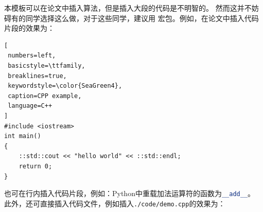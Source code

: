 \label{sec:algorithm}
\begin{algorithm}[ht]
    \caption{梯度下降算法}
    \label{algo:sgd}
\end{algorithm}

本模板可以在论文中插入算法，但是插入大段的代码是不明智的。
然而这并不妨碍有的同学选择这么做，对于这些同学，建议用  宏包。例如，在论文中插入代码片段的效果为：

\begin{lstlisting}[
 numbers=left,
 basicstyle=\ttfamily,
 breaklines=true,
 keywordstyle=\color{SeaGreen4},
 caption=CPP example,
 language=C++
]
#include <iostream>
int main()
{
    ::std::cout << "hello world" << ::std::endl;
    return 0;
}
\end{lstlisting}

也可在行内插入代码片段，例如：Python中重载加法运算符的函数为\lstinline[language=Python,keywordstyle=\color{SeaGreen4}]{__add__}。
此外，还可直接插入代码文件，例如插入\texttt{./code/demo.cpp}的效果为：


